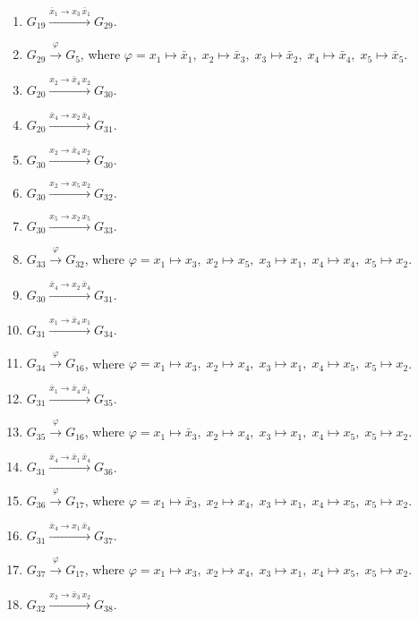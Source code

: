 \begin{enumerate}[leftmargin=*]
\item $G_{19} \xrightarrow{\bar{x}_{1} \to x_{3}\,\bar{x}_{1}} G_{29}$.
\item $G_{29} \xrightarrow{\varphi} G_{5}$, where $\varphi=x_{1} \mapsto \bar{x}_{1},\; x_{2} \mapsto \bar{x}_{3},\; x_{3} \mapsto \bar{x}_{2},\; x_{4} \mapsto \bar{x}_{4},\; x_{5} \mapsto \bar{x}_{5}$.
\item $G_{20} \xrightarrow{x_{2} \to \bar{x}_{4}\,x_{2}} G_{30}$.
\item $G_{20} \xrightarrow{\bar{x}_{4} \to x_{2}\,\bar{x}_{4}} G_{31}$.
\item $G_{30} \xrightarrow{x_{2} \to \bar{x}_{4}\,x_{2}} G_{30}$.
\item $G_{30} \xrightarrow{x_{2} \to x_{5}\,x_{2}} G_{32}$.
\item $G_{30} \xrightarrow{x_{5} \to x_{2}\,x_{5}} G_{33}$.
\item $G_{33} \xrightarrow{\varphi} G_{32}$, where $\varphi=x_{1} \mapsto x_{3},\; x_{2} \mapsto x_{5},\; x_{3} \mapsto x_{1},\; x_{4} \mapsto x_{4},\; x_{5} \mapsto x_{2}$.
\item $G_{30} \xrightarrow{\bar{x}_{4} \to x_{2}\,\bar{x}_{4}} G_{31}$.
\item $G_{31} \xrightarrow{x_{1} \to \bar{x}_{4}\,x_{1}} G_{34}$.
\item $G_{34} \xrightarrow{\varphi} G_{16}$, where $\varphi=x_{1} \mapsto x_{3},\; x_{2} \mapsto x_{4},\; x_{3} \mapsto x_{1},\; x_{4} \mapsto x_{5},\; x_{5} \mapsto x_{2}$.
\item $G_{31} \xrightarrow{\bar{x}_{1} \to \bar{x}_{4}\,\bar{x}_{1}} G_{35}$.
\item $G_{35} \xrightarrow{\varphi} G_{16}$, where $\varphi=x_{1} \mapsto \bar{x}_{3},\; x_{2} \mapsto x_{4},\; x_{3} \mapsto x_{1},\; x_{4} \mapsto x_{5},\; x_{5} \mapsto x_{2}$.
\item $G_{31} \xrightarrow{\bar{x}_{4} \to \bar{x}_{1}\,\bar{x}_{4}} G_{36}$.
\item $G_{36} \xrightarrow{\varphi} G_{17}$, where $\varphi=x_{1} \mapsto \bar{x}_{3},\; x_{2} \mapsto x_{4},\; x_{3} \mapsto x_{1},\; x_{4} \mapsto x_{5},\; x_{5} \mapsto x_{2}$.
\item $G_{31} \xrightarrow{\bar{x}_{4} \to x_{1}\,\bar{x}_{4}} G_{37}$.
\item $G_{37} \xrightarrow{\varphi} G_{17}$, where $\varphi=x_{1} \mapsto x_{3},\; x_{2} \mapsto x_{4},\; x_{3} \mapsto x_{1},\; x_{4} \mapsto x_{5},\; x_{5} \mapsto x_{2}$.
\item $G_{32} \xrightarrow{x_{2} \to \bar{x}_{3}\,x_{2}} G_{38}$.

\end{enumerate}
